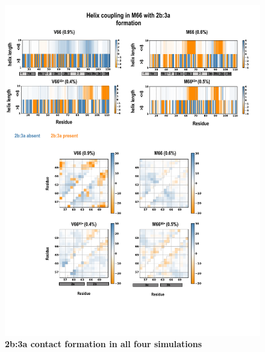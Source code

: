 \documentclass[10pt,letterpaper]{article}
\begin{document}
\begin{figure}[!ht]
\includegraphics[scale=0.5,width=12cm,trim={0 0cm 0 0cm},clip]{../figures/coupling_1.pdf}
\caption{{\bf 2b:3a contact formation in all four simulations}
 }
\label{fig6}
\end{figure}
\end{document}
